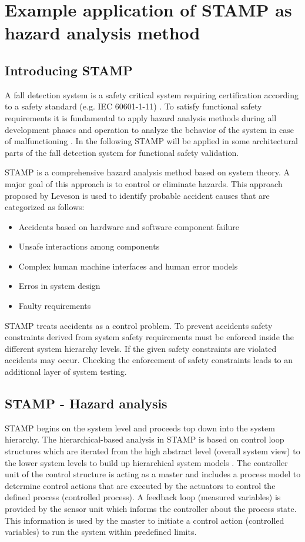 \documentclass[10pt,journal,compsoc]{IEEEtran}
\begin{document}
\section{Example application of STAMP as hazard analysis method}
\label{sec:STAMP}

\subsection{Introducing STAMP}
A fall detection system is a safety critical system requiring certification according to a safety standard (e.g. IEC 60601-1-11) \cite{international2005medical}. To satisfy functional safety requirements it is fundamental to apply hazard analysis methods during all development phases and operation to analyze the behavior of the system in case of malfunctioning \cite{STAMPThesis}. In the following STAMP will be applied in some architectural parts of the fall detection system for functional safety validation.

STAMP is a comprehensive hazard analysis method based on system theory. A major goal of this approach is to control or eliminate hazards. This approach proposed by Leveson \cite{leveson2011engineering} is used to identify probable accident causes that are categorized as follows:
\begin{itemize}
	\item Accidents based on hardware and software component failure
	\item Unsafe interactions among components
	\item Complex human machine interfaces and human error models
	\item Erros in system design
	\item Faulty requirements
\end{itemize}  
STAMP treats accidents as a control problem. To prevent accidents safety constraints derived from system safety requirements must be enforced inside the different system hierarchy levels. If the given safety constraints are violated accidents may occur. Checking the enforcement of safety constraints leads to an additional layer of system testing. 

\subsection{STAMP - Hazard analysis}
STAMP begins on the system level and proceeds top down into the system hierarchy. The hierarchical-based analysis in STAMP is based on control loop structures which are iterated from the high abstract level (overall system view) to the lower system levels to build up hierarchical system models \cite{leveson2011engineering}. 
The controller unit of the control structure is acting as a master and includes a process model to determine control actions that are executed by the actuators to control the defined process (controlled process). A feedback loop (measured variables) is provided by the sensor unit which informs the controller about the process state. This information is used by the master to initiate a control action (controlled variables) to run the system within predefined limits. 
\end{document}
